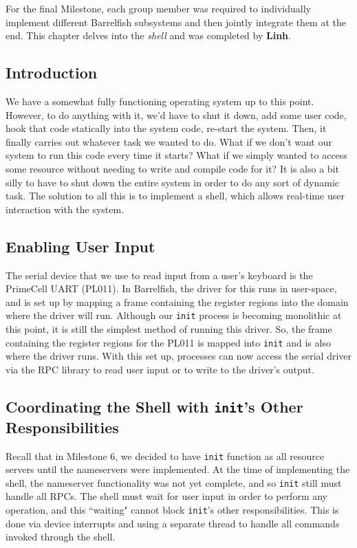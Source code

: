 For the final Milestone, each group member was required to individually implement different Barrelfish subsystems and then jointly integrate them at the end. This chapter delves into the \textit{shell} and was completed by \textbf{Linh}.

\subsection{Introduction}
We have a somewhat fully functioning operating system up to this point. However, to do anything with it, we'd have to shut it down, add some user code, hook that code statically into the system code, re-start the system. Then, it finally carries out whatever task we wanted to do. What if we don't want our system to run this code every time it starts? What if we simply wanted to access some resource without needing to write and compile code for it? It is also a bit silly to have to shut down the entire system in order to do any sort of dynamic task. The solution to all this is to implement a shell, which allows real-time user interaction with the system.

\subsection{Enabling User Input}
The serial device that we use to read input from a user's keyboard is the PrimeCell UART (PL011).  In Barrelfish, the driver for this runs in user-space, and is set up by mapping a frame containing the register regions into the domain where the driver will run. Although our \texttt{init} process is becoming monolithic at this point, it is still the simplest method of running this driver. So, the frame containing the register regions for the PL011 is mapped into \texttt{init} and is also where the driver runs. With this set up, processes can now access the serial driver via the RPC library to read user input or to write to the driver's output. 


\subsection{Coordinating the Shell with \texttt{init}'s Other Responsibilities}
Recall that in Milestone 6, we decided to have \texttt{init} function as all resource servers until the nameservers were implemented. At the time of implementing the shell, the nameserver functionality was not yet complete, and so \texttt{init} still must handle all RPCs. The shell must wait for user input in order to perform any operation, and this ``waiting" cannot block \texttt{init}'s other responsibilities. This is done via device interrupts and using a separate thread to handle all commands invoked through the shell. 


